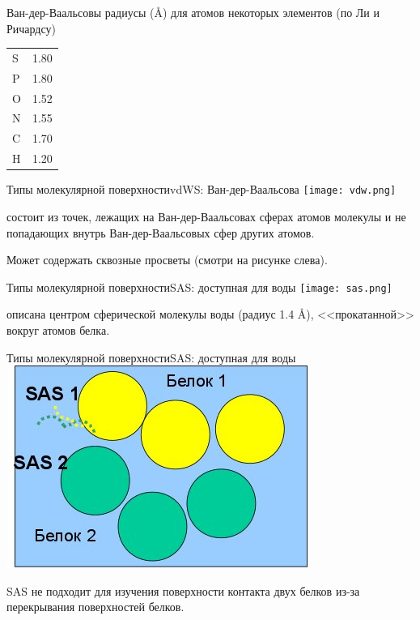 \documentclass{beamer}
\begin{document}
    \begin{frame}{Ван-дер-Ваальсовы радиусы (\AA) для атомов
        некоторых элементов (по Ли и Ричардсу)}
        \begin{tabular}{ l l }
            S & 1.80 \\
            P & 1.80 \\
            O & 1.52 \\
            N & 1.55 \\
            C & 1.70 \\
            H & 1.20 \\
        \end{tabular}
    \end{frame}

    \begin{frame}{Типы молекулярной поверхности}{vdWS: Ван-дер-Ваальсова}
        \texttt{[image: vdw.png]}

        состоит из точек, лежащих на Ван-дер-Ваальсовах сферах атомов молекулы и
        не попадающих внутрь Ван-дер-Ваальсовых сфер других атомов.

        Может содержать сквозные просветы (смотри на рисунке слева).
    \end{frame}

    \begin{frame}{Типы молекулярной поверхности}{SAS: доступная для воды}
        \texttt{[image: sas.png]}

        описана центром сферической молекулы воды (радиус 1.4 \AA),
        <<прокатанной>> вокруг атомов белка.

    \end{frame}

    \begin{frame}{Типы молекулярной поверхности}{SAS: доступная для воды}
        \includegraphics[width=0.5\linewidth]{sas-contact.jpg}

        SAS не подходит для изучения поверхности контакта двух белков
        из-за перекрывания поверхностей белков.
    \end{frame}
\end{document}
